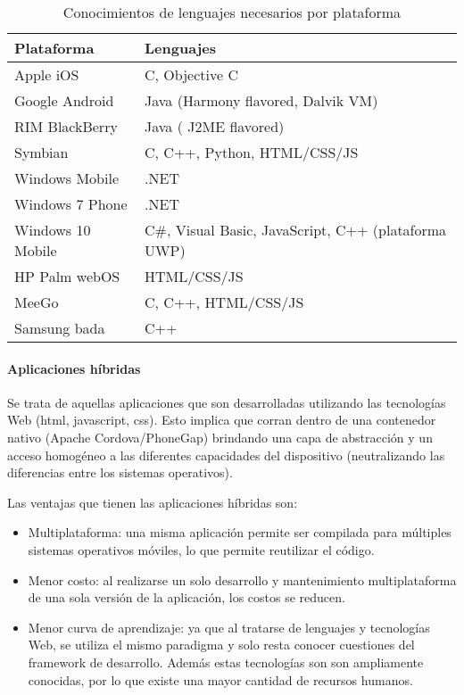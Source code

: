 \begin{table}[]
\centering
\caption{Conocimientos de lenguajes necesarios por plataforma\cite{charland2011mobile}}
\label{languajes_plataforma}
\begin{tabular}{|l|l|}
\hline
\textbf{Plataforma} & \textbf{Lenguajes}                 \\ \hline
Apple iOS           & C, Objective C                     \\ \hline
Google Android      & Java (Harmony flavored, Dalvik VM) \\ \hline
RIM BlackBerry      & Java ( J2ME flavored)              \\ \hline
Symbian             & C, C++, Python, HTML/CSS/JS        \\ \hline
Windows Mobile      & .NET                               \\ \hline
Windows 7 Phone      & .NET                               \\ \hline
Windows 10 Mobile      & C\#, Visual Basic, JavaScript, C++ (plataforma UWP)\\ \hline
HP Palm webOS       & HTML/CSS/JS                        \\ \hline
MeeGo               & C, C++, HTML/CSS/JS                \\ \hline
Samsung bada        & C++                                \\ \hline
\end{tabular}
\end{table}

\paragraph{Aplicaciones híbridas}
\label{apps_hibirdas}

Se trata de aquellas aplicaciones que son desarrolladas utilizando las tecnologías Web (\gls{html}, \gls{javascript}, \gls{css}). Esto implica que corran dentro de una contenedor nativo (Apache Cordova/PhoneGap) brindando una capa de abstracción y un acceso homogéneo a las diferentes capacidades del dispositivo (neutralizando las diferencias entre los sistemas operativos).

Las ventajas que tienen las aplicaciones híbridas son:
\begin{itemize}
\item Multiplataforma: una misma aplicación permite ser compilada para múltiples sistemas operativos móviles, lo que permite reutilizar el código.
\item Menor costo: al realizarse un solo desarrollo y mantenimiento multiplataforma de una sola versión de la aplicación, los costos se reducen.
\item Menor curva de aprendizaje: ya que al tratarse de lenguajes y tecnologías Web, se utiliza el mismo paradigma y solo resta conocer cuestiones del \gls{framework} de desarrollo. Además estas tecnologías son  son ampliamente conocidas, por lo que existe una mayor cantidad de recursos humanos.
\end{itemize}


